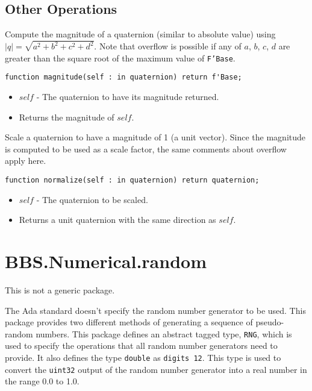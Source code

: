 \documentclass[10pt, openany]{book}
\newcommand{\datatype}[1]{\texttt{#1}}
\begin{document}
\subsection{Other Operations}

Compute the magnitude of a quaternion (similar to absolute value) using $|q| = \sqrt{a^2+b^2+c^2+d^2}$.  Note that overflow is possible if any of $a$, $b$, $c$, $d$ are greater than the square root of the maximum value of \datatype{F'Base}.
\begin{lstlisting}
function magnitude(self : in quaternion) return f'Base;
\end{lstlisting}
\begin{itemize}
  \item $self$ - The quaternion to have its magnitude returned.
  \item Returns the magnitude of $self$.
\end{itemize}

Scale a quaternion to have a magnitude of 1 (a unit vector).  Since the magnitude is computed to be used as a scale factor, the same comments about overflow apply here.
\begin{lstlisting}
function normalize(self : in quaternion) return quaternion;
\end{lstlisting}
\begin{itemize}
  \item $self$ - The quaternion to be scaled.
  \item Returns a unit quaternion with the same direction as $self$.
\end{itemize}

\section{BBS.Numerical.random}
This is not a generic package.

The Ada standard doesn't specify the random number generator to be used.  This package provides two different methods of generating a sequence of pseudo-random numbers.  This package defines an abstract tagged type, \datatype{RNG}, which is used to specify the operations that all random number generators need to provide.  It also defines the type \datatype{double} as \datatype{digits 12}.  This type is used to convert the \datatype{uint32} output of the random number generator into a real number in the range 0.0 to 1.0.
\end{document}
